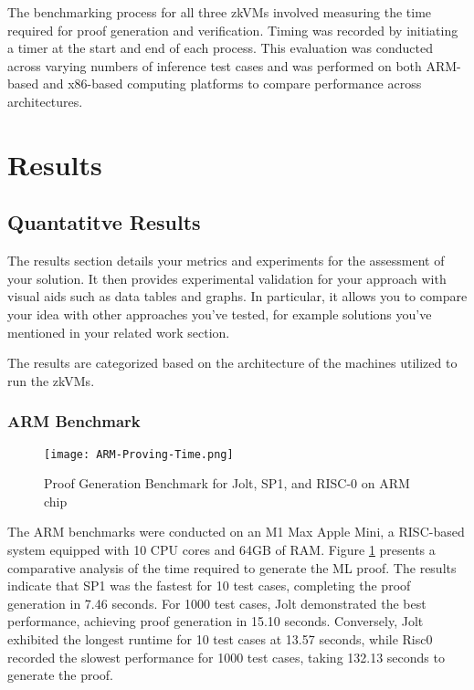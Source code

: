 \documentclass{scrartcl}
\begin{document}
The benchmarking process for all three zkVMs involved measuring the time required for proof generation and verification. Timing was recorded by initiating a timer at the start and end of each process. This evaluation was conducted across varying numbers of inference test cases and was performed on both ARM-based and x86-based computing platforms to compare performance across architectures.

\section{Results}

\subsection{Quantatitve Results}

The results section details your metrics and experiments for the assessment of your solution. It then provides experimental validation for your approach with visual aids such as data tables and graphs. In particular, it allows you to compare your idea with other approaches you've tested, for example solutions you've mentioned in your related work section.

The results are categorized based on the architecture of the machines utilized to run the zkVMs.

\subsubsection{ARM Benchmark}

\begin{figure}
	\begin{center}
		\texttt{[image: ARM-Proving-Time.png]}
	\end{center}
	\caption{Proof Generation Benchmark for Jolt, SP1, and RISC-0 on ARM chip}
	\label{graph:arm-proving-time}
\end{figure}

The ARM benchmarks were conducted on an M1 Max Apple Mini, a RISC-based system equipped with 10 CPU cores and 64GB of RAM. Figure \ref{graph:arm-proving-time} presents a comparative analysis of the time required to generate the ML proof. The results indicate that SP1 was the fastest for 10 test cases, completing the proof generation in 7.46 seconds. For 1000 test cases, Jolt demonstrated the best performance, achieving proof generation in 15.10 seconds. Conversely, Jolt exhibited the longest runtime for 10 test cases at 13.57 seconds, while Risc0 recorded the slowest performance for 1000 test cases, taking 132.13 seconds to generate the proof.
\end{document}
